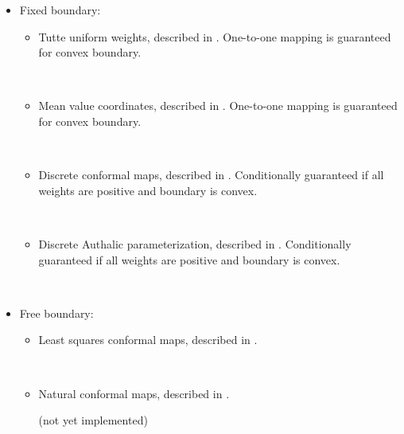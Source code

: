\begin{itemize}

\item Fixed boundary:

    \begin{itemize}

    \item Tutte uniform weights, described in \cite{cgal:fh-survey-05}.
    One-to-one mapping is guaranteed for convex boundary.

      \\

    \item Mean value coordinates, described in \cite{cgal:f-mvc-03}.
    One-to-one mapping is guaranteed for convex boundary.

      \\

    \item Discrete conformal maps, described in \cite{cgal:fh-survey-05}.
    Conditionally guaranteed if all weights are positive and boundary is convex.

      \\

    \item Discrete Authalic parameterization, described in \cite{cgal:dma-ipsm-02}.
    Conditionally guaranteed if all weights are positive and boundary is convex.

      \\

    \end{itemize}

\item Free boundary:

    \begin{itemize}

    \item Least squares conformal maps, described in \cite{cgal:lprm-lscm-02}.

      \\

    \item Natural conformal maps, described in \cite{cgal:dma-ipsm-02}.

    (not yet implemented)

    \end{itemize}

\end{itemize}


